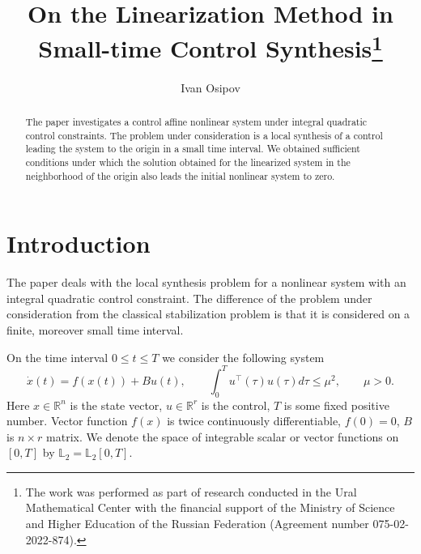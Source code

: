 \documentclass[12pt]{llncs}
\begin{document}
%
\fi
\title{On the Linearization Method in Small-time Control Synthesis\thanks{The work was performed as part of research conducted
		in the Ural Mathematical Center with the financial support
		of the Ministry of Science and Higher Education of the Russian Federation
		(Agreement number 075-02-2022-874).}}
\author{Ivan Osipov 
}

\maketitle

\begin{abstract}
The paper investigates a control affine nonlinear system under integral quadratic control constraints. The problem under consideration is a local synthesis of a control leading the system to the origin in a small time interval. We obtained sufficient conditions under which the solution obtained for the linearized system in the neighborhood of the origin also leads the initial nonlinear system to zero. 

\end{abstract}

\section{Introduction}
The paper deals with the local synthesis problem for a nonlinear system with an integral quadratic control constraint. The difference of the problem under consideration
from the classical stabilization problem is that it is considered on a finite, moreover small time interval. 

On the time interval $ 0 \leq t \leq T $ we consider the following system
\begin{equation}\label{nonlinear}
	\dot{x}(t)=f(x(t))+B u(t), \qquad \int_0^T u^{\top}(\tau) u(\tau) d\tau \leq \mu^2, \qquad \mu > 0.
\end{equation} 
Here $ x \in \mathbb{R}^n $ is the state vector, $ u \in \mathbb{R}^r $ is the control, $ T $ is some fixed positive number. Vector function $f(x)$ is twice continuously differentiable, $f(0)=0$, $B$ is $n \times r$ matrix. We denote the space of integrable scalar or vector functions on $ [0,T] $ by $ \mathbb{L}_2 = \mathbb{L}_2[0,T] $. 
\end{document}
